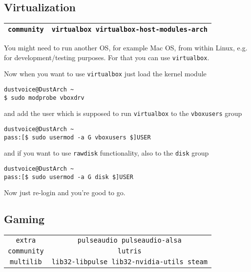 \documentclass[9pt]{report}
\begin{document}
\vfill\eject

\hypertarget{x-virtualization}{\subsection{Virtualization}}
\begin{center}
\begin{tabular}{|c|c|}
\hline
\texttt{community} & \texttt{virtualbox virtualbox-host-modules-arch} \\ 
\hline
\end{tabular}
\end{center}

You might need to run another OS, for example Mac OS, from within Linux, e.g. for development/testing purposes.
For that you can use \texttt{virtualbox}.


Now when you want to use \texttt{virtualbox} just load the kernel module


\begin{verbatim}
dustvoice@DustArch ~
$ sudo modprobe vboxdrv
\end{verbatim}

and add the user which is supposed to run \texttt{virtualbox} to the \texttt{vboxusers} group


\begin{verbatim}
dustvoice@DustArch ~
pass:[$ sudo usermod -a G vboxusers $]USER
\end{verbatim}

and if you want to use \texttt{rawdisk} functionality, also to the \texttt{disk} group


\begin{verbatim}
dustvoice@DustArch ~
pass:[$ sudo usermod -a G disk $]USER
\end{verbatim}

Now just re-login and you’re good to go.



\vfill\eject

\hypertarget{x-gaming}{\subsection{Gaming}}
\begin{center}
\begin{tabular}{|c|c|}
\hline
\texttt{extra} & \texttt{pulseaudio pulseaudio-alsa} \\ 
\texttt{community} & \texttt{lutris} \\ 
\texttt{multilib} & \texttt{lib32-libpulse lib32-nvidia-utils steam} \\ 
\hline
\end{tabular}
\end{center}
\end{document}
